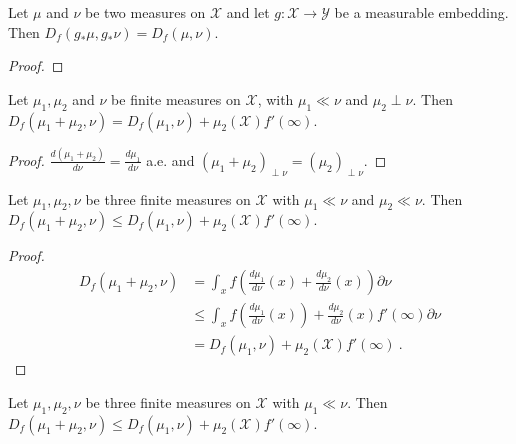 \begin{lemma}
  \label{lem:fDiv_map_measurableEmbedding}
  \leanok
  Let $\mu$ and $\nu$ be two measures on $\mathcal X$ and let $g : \mathcal X \to \mathcal Y$ be a measurable embedding. Then $D_f(g_* \mu, g_* \nu) = D_f(\mu, \nu)$.
\end{lemma}

\begin{proof}\leanok
\end{proof}

\begin{lemma}
  \label{lem:fDiv_absolutelyContinuous_add_mutuallySingular}
  \leanok
  Let $\mu_1, \mu_2$ and $\nu$ be finite measures on $\mathcal X$, with $\mu_1 \ll \nu$ and $\mu_2 \perp \nu$.
  Then $D_f(\mu_1 + \mu_2, \nu) = D_f(\mu_1, \nu) + \mu_2(\mathcal X) f'(\infty)$.
\end{lemma}

\begin{proof}\leanok
$\frac{d(\mu_1 + \mu_2)}{d \nu} = \frac{d \mu_1}{d \nu}$ a.e. and $(\mu_1 + \mu_2)_{\perp \nu} = (\mu_2)_{\perp \nu}$.
\end{proof}

\begin{lemma}
  \label{lem:fDiv_add_measure_le_of_ac}
  \leanok
  Let $\mu_1, \mu_2, \nu$ be three finite measures on $\mathcal X$ with $\mu_1 \ll \nu$ and $\mu_2 \ll \nu$. Then
  $D_f(\mu_1 + \mu_2, \nu) \le D_f(\mu_1, \nu) + \mu_2(\mathcal X) f'(\infty)$.
\end{lemma}

\begin{proof}\leanok
\begin{align*}
D_f(\mu_1 + \mu_2, \nu)
&= \int_x f \left( \frac{d \mu_1}{d\nu}(x) + \frac{d\mu_2}{d\nu}(x) \right) \partial \nu
\\
&\le \int_x f \left( \frac{d \mu_1}{d\nu}(x) \right) + \frac{d\mu_2}{d\nu}(x) f'(\infty) \partial \nu
\\
&= D_f(\mu_1, \nu) + \mu_2(\mathcal X) f'(\infty)
\: .
\end{align*}
\end{proof}

\begin{lemma}
  \label{lem:fDiv_add_measure_le}
  \leanok
  Let $\mu_1, \mu_2, \nu$ be three finite measures on $\mathcal X$ with $\mu_1 \ll \nu$. Then
  $D_f(\mu_1 + \mu_2, \nu) \le D_f(\mu_1, \nu) + \mu_2(\mathcal X) f'(\infty)$.
\end{lemma}

